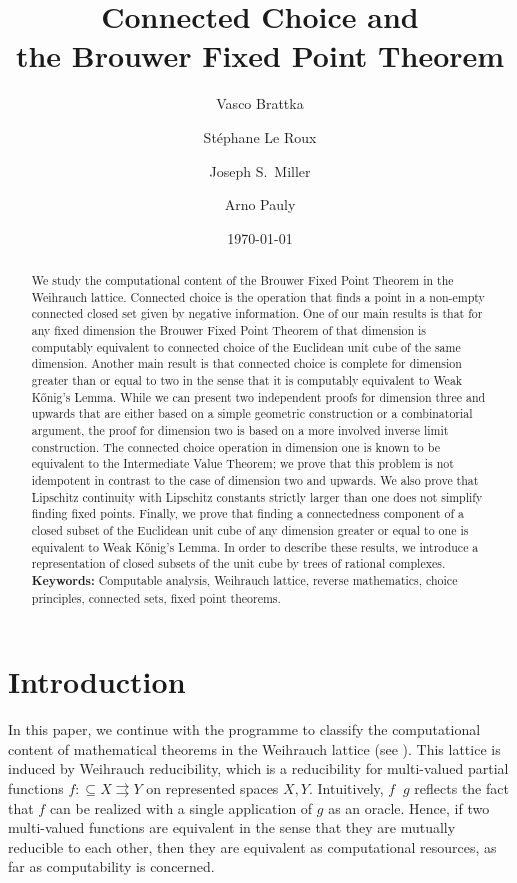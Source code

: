 \documentclass[a4paper]{amsart}
\title[Connected Choice and the Brouwer Fixed Point Theorem]
{Connected Choice and\\ the Brouwer Fixed Point Theorem}
\author{Vasco Brattka}
\author{St\'{e}phane Le Roux}
\author{Joseph S.\ Miller}
\author{Arno Pauly}
\date{\today}
\def\In{\subseteq}
\def\mto{\rightrightarrows}
\def\leqW{\mathop{\leq_{\mathrm{W}}}}
\theoremstyle{definition}
\begin{document}
\maketitle

\begin{abstract}
We study the computational content of the Brouwer Fixed Point Theorem in the Weihrauch lattice.
Connected choice is the operation that finds a point in a non-empty
connected closed set given by negative information. 
One of our main results is that for any fixed dimension the Brouwer Fixed Point Theorem of that dimension 
is computably equivalent to connected choice of the Euclidean unit cube of the same dimension. 
Another main result is that connected choice is complete
for dimension greater than or equal to two in the sense that it is computably equivalent
to Weak K\H{o}nig's Lemma. 
While we can present two independent proofs for dimension three and upwards that are either based on a simple geometric construction
or a combinatorial argument, 
the proof for dimension two is based on a more involved inverse limit construction.
The connected choice operation in dimension one is known to be equivalent to the Intermediate Value Theorem;
we prove that this problem is not idempotent in contrast to the case of dimension two and upwards.
We also prove that Lipschitz continuity with Lipschitz constants strictly larger than one does not
simplify finding fixed points. 
Finally, we prove that finding a connectedness component of a closed subset
of the Euclidean unit cube of any dimension greater or equal to one is equivalent to
Weak K\H{o}nig's Lemma.  
In order to describe these results, we introduce a representation
of closed subsets of the unit cube by trees of rational complexes.\\[0.2cm]
{\bf Keywords:} Computable analysis, Weihrauch lattice, reverse mathematics, 
choice principles, connected sets, fixed point theorems.
\end{abstract}

\tableofcontents
\pagebreak


\section{Introduction}
\label{sec:introduction}

In this paper, we continue with the programme to classify the computational content of mathematical
theorems in the Weihrauch lattice (see \cite{GM09,BG11,BG11a,Pau09,Pau10,BGM12,HRW12}).
This lattice is induced by Weihrauch reducibility, which is a reducibility for multi-valued partial functions 
$f:\In X\mto Y$ on represented spaces $X,Y$. 
Intuitively, $f\leqW g$ reflects the fact that $f$ can be realized
with a single application of $g$ as an oracle. Hence, if two multi-valued functions are equivalent
in the sense that they are mutually reducible to each other, then they are equivalent as 
computational resources, as far as computability is concerned.
\end{document}
